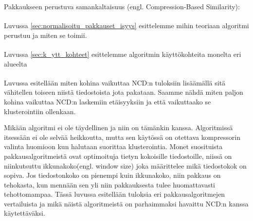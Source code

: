 \documentclass[11pt,finnish]{tktltiki2}
\theoremstyle{definition}
\theoremstyle{remark}
\begin{document}
  Pakkaukseen perustuva samankaltaisuus (engl. Compression-Based Similarity):


\paragraph{} %
\label{par:intro-2}
  Luvussa \ref{sec:normalisoitu_pakkauset_isyys} esittelemme mihin teoriaan algoritmi perustuu ja miten se toimii.


\paragraph{} %
\label{par:intro-3}
  Luvussa \ref{sec:k_ytt_kohteet} esittelemme algoritmin käyttökohteita monelta eri alueelta

  \iffalse
    The clustering we use is hierarchical clustering indendrograms based on a new fast heuristic for the quartet method. The method is available as an open-source software tool. Below we explain the method, the theory underpinning it, and present evidence for its universality and robustness by experiments and results in a plethora of different areas using different types of compressors.
  \fi


\paragraph{} %
\label{par:intro-4}
  Luvussa esitellään miten kohina vaikuttaa NCD:n tuloksiin lisäämällä sitä vähitellen toiseen niistä tiedostoista jota pakataan. Saamme nähdä miten paljon kohina vaikuttaa NCD:n laskemiin etäisyyksiin ja että vaikuttaako se klusterointiin ollenkaan.

  Mikään algoritmi ei ole täydellinen ja niin on tämänkin kanssa. Algoritmissä itsessään ei ole selvää heikkoutta, mutta sen käytössä on otettava kompressorin valinta huomioon kun halutaan suorittaa klusterointia. Monet suosituista pakkausalgoritmeistä ovat optimoituja tietyn kokoisille tiedostoille, niissä on niinkutsuttu ikkunakoko(engl. window size) joka määrittelee mikä tiedostokok on sopiva. Jos tiedostonkoko on pienempi kuin ikkunakoko, niin pakkaus on tehokasta, kun mennään sen yli niin pakkauksesta tulee huomattavasti tehottomampaa. Tässä luvussa esitellään tuloksia eri pakkausalgoritmejen vertailuista ja mikä näistä algoritmeistä on parhaimmaksi havaittu NCD:n kanssa käytettäväksi.
\end{document}
